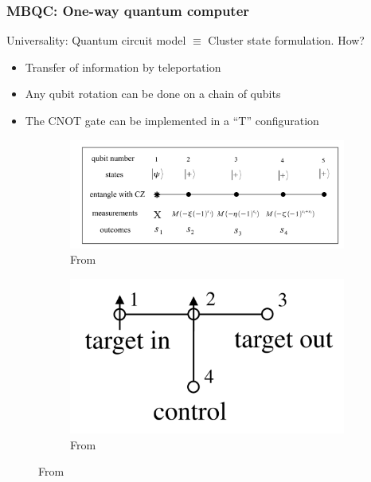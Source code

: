 \documentclass{beamer}
\theoremstyle{definition}
\begin{document}
\begin{frame}
\frametitle{MBQC: One-way quantum computer}

Universality: Quantum circuit model $\equiv$ Cluster state formulation. \pause How? \pause

\begin{itemize}
	\item Transfer of information by teleportation
	\pause
	\item Any qubit rotation can be done on a chain of qubits
	\pause
	\item The CNOT gate can be implemented in a ``T'' configuration
\end{itemize}
\pause
\begin{figure}[!htb]
	\begin{subfigure}{.5\textwidth}
		\centering
		\includegraphics[scale=0.15]{rotate}
		\caption{From \cite{jozsa}}
	\end{subfigure}%
	\begin{subfigure}{.5\textwidth}
		\centering
		\includegraphics[scale=0.15]{CNOT}
		\caption{From \cite{MBQC}}
	\end{subfigure}
	
	
\end{figure}






\end{frame}
\end{document}
